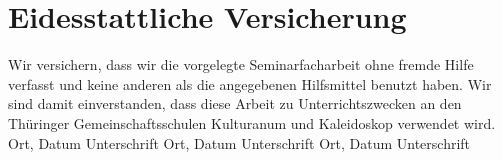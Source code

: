 \chapter{Eidesstattliche Versicherung}
\noindent
Wir versichern, dass wir die vorgelegte Seminarfacharbeit ohne fremde Hilfe verfasst und keine anderen als die angegebenen Hilfsmittel benutzt haben.
Wir sind damit einverstanden, dass diese Arbeit zu Unterrichtszwecken an den Thüringer Gemeinschaftsschulen Kulturanum und Kaleidoskop verwendet wird.
\newline
\newline
Ort, Datum \qquad \qquad \qquad Unterschrift
\newline
\newline
\newline
Ort, Datum \qquad \qquad \qquad Unterschrift
\newline
\newline
\newline
Ort, Datum \qquad \qquad \qquad Unterschrift 